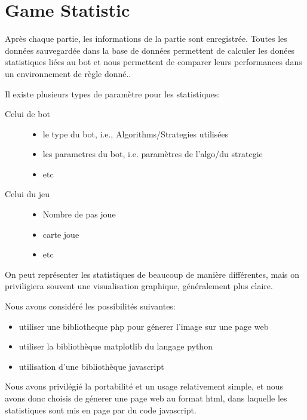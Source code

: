 \section{Game Statistic}

Après chaque partie, les informations de la partie sont enregistrée. Toutes les données sauvegardée dans la base de données permettent de calculer les donées statistiques liées au bot et nous permettent de comparer leurs performances dans un environnement de règle donné..

Il existe plusieurs types de paramètre pour les statistiques:\\

\begin{description}
\item[Celui de bot]
  \begin{itemize}
  \item le type du bot, i.e., Algorithms/Strategies utilisées
  \item les parametres du bot, i.e. paramètres de l'algo/du strategie
  \item etc
  \end{itemize}
\item[Celui du jeu]
  \begin{itemize}
  \item Nombre de pas joue
  \item carte joue
  \item etc
  \end{itemize}
\end{description}

On peut représenter les statistiques de beaucoup de manière différentes, mais on priviligiera souvent une visualisation graphique, généralement plus claire.

Nous avons considéré les possibilités suivantes:\\
\begin{itemize}
\item utiliser une bibliotheque php pour génerer l'image sur une page web
\item utiliser la bibliothèque matplotlib du langage python
\item utilisation d'une bibliothèque javascript
\end{itemize}

Nous avons privilégié la portabilité et un usage relativement simple, et nous avons donc choisis de génerer une page web au format html, dans laquelle les statistiques sont mis en page par du code javascript.


